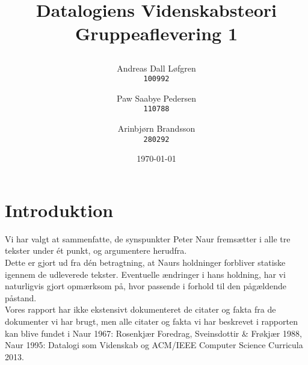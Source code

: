 \documentclass[11pt,a4paper,oneside,final]{article}
\title{ %
    \vspace{2in}
    \LARGE{Datalogiens Videnskabsteori}\\
    \huge{Gruppeaflevering 1}
    \author{ %
        \begin{minipage}{0.30\textwidth}
            \centering
            Andreas Dall Løfgren\\
            \texttt{100992}
        \end{minipage}
        \vspace{5pt}
        \and
        \begin{minipage}{0.30\textwidth}
            \centering
            Paw Saabye Pedersen\\
            \texttt{110788}
        \end{minipage}
        \vspace{5pt}
        \and
        \begin{minipage}{0.35\textwidth}
            \centering
            Arinbjørn Brandsson\\
            \texttt{280292}
        \end{minipage}
    }
    \setcounter{page}{0}
    \date{\today}
}
\begin{document}
\maketitle
\thispagestyle{empty}
\newpage

\thispagestyle{psty:toc}
\tableofcontents
\newpage

\section{Introduktion}
Vi har valgt at sammenfatte, de synspunkter Peter Naur fremsætter i alle tre
tekster under ét punkt, og argumentere herudfra.\\
Dette er gjort ud fra dén betragtning, at Naurs holdninger forbliver statiske
igennem de udleverede tekster. Eventuelle ændringer i hans holdning, har vi
naturligvis gjort opmærksom på, hvor passende i forhold til den pågældende
påstand.\\
Vores rapport har ikke ekstensivt dokumenteret de citater og fakta fra de 
dokumenter vi har brugt, men alle citater og fakta vi har beskrevet i rapporten 
kan blive fundet i Naur 1967: Rosenkjær Foredrag, Sveinsdottir \& Frøkjær 1988, 
Naur 1995: Datalogi som Videnskab og ACM/IEEE Computer Science Curricula 2013.








\end{document}
